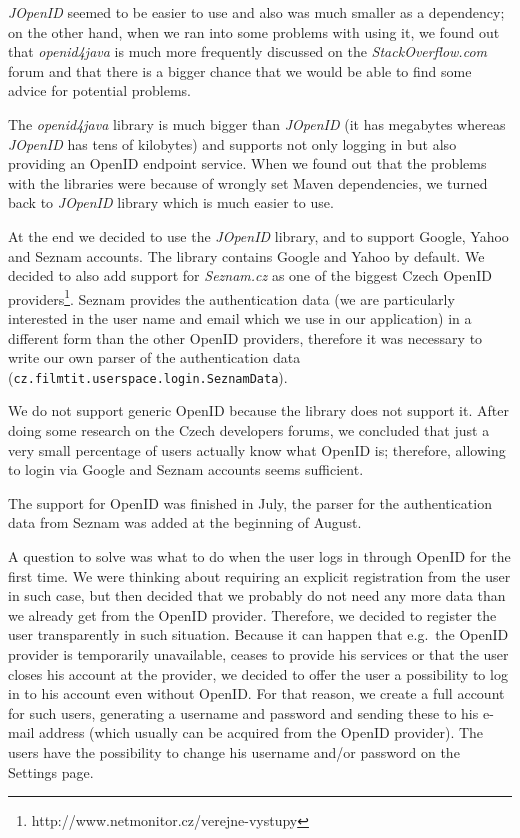 \emph{JOpenID} seemed to be easier to use and also was much smaller as a 
dependency; on the other hand, when we ran into some problems with using 
it, we found out that \emph{openid4java} is much more frequently 
discussed on the \emph{StackOverflow.com} forum and that there is a 
bigger chance that we would be able to find some advice for potential 
problems.

The \emph{openid4java} library is much bigger than \emph{JOpenID} (it has megabytes whereas \emph{JOpenID} has tens of kilobytes) and supports not only logging in but also providing an OpenID endpoint service. When we found out that the problems with the libraries were because of wrongly set Maven dependencies, we turned back to \emph{JOpenID} library which is much easier to use.

At the end we decided to use the \emph{JOpenID} library, and to support Google, Yahoo and Seznam accounts. The library contains Google and Yahoo by default. We decided to also add support for \emph{Seznam.cz} as one of the biggest Czech OpenID providers\footnote{http://www.netmonitor.cz/verejne-vystupy}. Seznam provides the authentication data (we are particularly interested in the user name and email which we use in our application) in a different form than the other OpenID providers, therefore it was necessary to write our own parser of the authentication data ({\tt{cz.filmtit.userspace.login.SeznamData}}).

We do not support generic OpenID because the library does not support it. After doing some research on the Czech developers forums, we concluded that just a very small percentage of users actually know what OpenID is; therefore, allowing to login via Google and Seznam accounts seems sufficient.

The support for OpenID was finished in July, the parser for the authentication data from Seznam was added at the beginning of August.

A question to solve was what to do when the user logs in through OpenID for the first time. We were thinking about requiring an explicit registration from the user in such case, but then decided that we probably do not need any more data than we already get from the OpenID provider. Therefore, we decided to register the user transparently in such situation.
Because it can happen that e.g.\ the OpenID provider is temporarily unavailable, ceases to provide his services or that the user closes his account at the provider, we decided to offer the user a possibility to log in to his account even without OpenID. For that reason, we create a full account for such users, generating a username and password and sending these to his e-mail address (which usually can be acquired from the OpenID provider). The users have the possibility to change his username and/or password on the Settings page.


